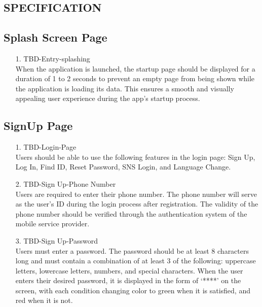 \documentclass[conference]{IEEEtran}
\begin{document}
\begin{enumerate}
\begin{itemize}
\begin{itemize}
\begin{table}
\end{table}

\clearpage


\section{SPECIFICATION}

\subsection{Splash Screen Page}
    \begin{enumerate}
    \item[1.] TBD-Entry-splashing \\
        When the application is launched, the startup page should be displayed for a duration of 1 to 2 seconds to prevent an empty page from being shown while the application is loading its data. This ensures a smooth and visually appealing user experience during the app’s startup process. \\
    \end{enumerate}

\subsection{SignUp Page}

    \begin{enumerate}
        \item[1.] TBD-Login-Page \\
        Users should be able to use the following features in the login page: Sign Up, Log In, Find ID, Reset Password, SNS Login, and Language Change. \\
    \end{enumerate}
    
    \begin{enumerate}
        \item[2.] TBD-Sign Up-Phone Number \\
        Users are required to enter their phone number. The phone number will serve as the user’s ID during the login process after registration. The validity of the phone number should be verified through the authentication system of the mobile service provider. \\
    \end{enumerate}
    
    \begin{enumerate}
        \item[3.] TBD-Sign Up-Password \\
        Users must enter a password. The password should be at least 8 characters long and must contain a combination of at least 3 of the following: uppercase letters, lowercase letters, numbers, and special characters. When the user enters their desired password, it is displayed in the form of ‘****’ on the screen, with each condition changing color to green when it is satisfied, and red when it is not. \\
    \end{enumerate}
    

\end{itemize}
\end{itemize}
\end{enumerate}
\end{document}

